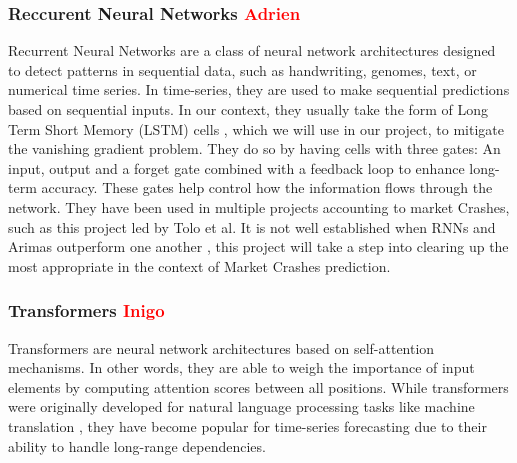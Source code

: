 \documentclass[12pt, letterpaper]{article}
\begin{document}
    \subsubsection*{Reccurent Neural Networks \textcolor{red}{Adrien}}
    Recurrent Neural Networks are a class of neural network architectures designed to detect patterns in sequential data, such as handwriting, genomes, text, or numerical time series. In time-series, they are used to make sequential predictions based on sequential inputs. \cite{Schmidt} In our context, they usually take the form of Long Term Short Memory (LSTM) cells \cite{Hansika}, which we will use in our project, to mitigate the vanishing gradient problem. They do so by having cells with three gates: An input, output and a forget gate combined with a feedback loop to enhance long-term accuracy. These gates help control how the information flows through the network. \cite{Hansika} They have been used in multiple projects accounting to market Crashes, such as this project led by Tolo et al. \cite{Tolo} It is not well established when RNNs and Arimas outperform one another \cite{Hansika}, this project will take a step into clearing up the most appropriate in the context of Market Crashes prediction.

    \subsubsection*{Transformers \textcolor{red}{Inigo}}
Transformers are neural network architectures based on self-attention mechanisms. In other words, they are able to weigh the importance of input elements by computing attention scores between all positions. While transformers were originally developed for natural language processing tasks like machine translation \cite{vaswani2017attention}, they have become popular for time-series forecasting due to their ability to handle long-range dependencies.
\end{document}
